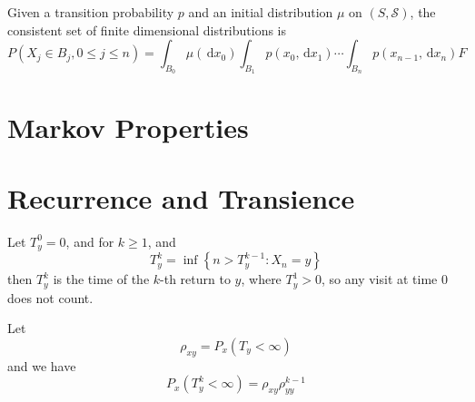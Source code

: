\begin{remark}
	Given a transition probability $p$ and an initial distribution $\mu$ on $(S,\mathcal{S})$, the consistent set of finite dimensional distributions is
	\begin{equation}
		P\left(X_{j}\in B_{j},0\leq j\leq n\right)=\int_{B_{0}}\mu\left(\,\mathrm{d}x_{0}\right)\int_{B_{1}}p\left(x_{0},\,\mathrm{d}x_{1}\right)\cdots\int_{B_{n}}p\left(x_{n-1},\,\mathrm{d}x_{n}\right)
		F    \end{equation}
\end{remark}

\section{Markov Properties}

\begin{definition}

\end{definition}

\begin{theorem}

\end{theorem}

\begin{corollary}

\end{corollary}

\begin{theorem}

\end{theorem}

\section{Recurrence and Transience}

Let $T_{y}^{0}=0$, and for $k\geq 1$, and
\begin{equation}
	T_{y}^{k}=\inf\left\{n>T_{y}^{k-1}:X_{n}=y\right\}
\end{equation}
then $T_{y}^{k}$ is the time of the $k$-th return to $y$, where $T_{y}^{1}>0$, so any visit at time 0 does not count.

Let
\begin{equation}
	\rho_{x y}=P_{x}\left(T_{y}<\infty\right)
\end{equation}
and we have
\begin{equation}
	P_{x}\left(T_{y}^{k}<\infty\right)=\rho_{xy}\rho_{yy}^{k-1}
\end{equation}

